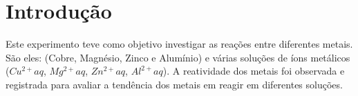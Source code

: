 \chapter{Introdução}

Este experimento teve como objetivo investigar as reações entre diferentes metais. São eles: (Cobre, Magnésio, Zinco e Alumínio) e várias soluções de íons metálicos ($Cu^{2+}{aq}$, $Mg^{2+}{aq}$, $Zn^{2+}{aq}$, $Al^{2+}{aq}$). A reatividade dos metais foi observada e registrada para avaliar a tendência dos metais em reagir em diferentes soluções.
